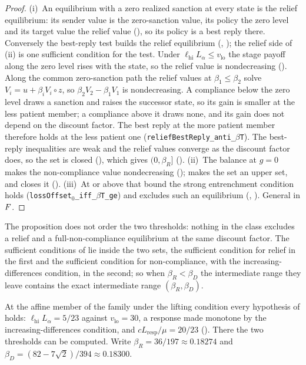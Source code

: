 \begin{proof}
(i)~An equilibrium with a zero realized sanction at every state is the relief equilibrium:
its sender value is the zero-sanction value, its policy the zero level and its target value
the relief value (), so its policy is a best reply
there. Conversely the best-reply test builds the relief equilibrium
(, ); the relief
side of (ii) is one sufficient condition for the test. Under
$\ell_{\mathrm{hi}}L_\alpha\le v_{\mathrm{lo}}$ the stage payoff along the zero level rises with
the state, so the relief value is nondecreasing (). Along the common
zero-sanction path the relief values at $\beta_1\le\beta_2$ solve $V_i=u+\beta_iV_i\circ z$,
so $\beta_2V_2-\beta_1V_1$ is nondecreasing. A compliance below the zero level draws a sanction
and raises the successor state, so its gain is smaller at the less patient member; a
compliance above it draws none, and its gain does not depend on the discount factor. The best
reply at the more patient member therefore holds at the less patient one
(\texttt{reliefBestReply\_anti\_$\beta$T}). The best-reply inequalities are weak and the relief
values converge as the discount factor does, so the set is closed
(), which gives $(0,\beta_R]$
(). (ii)~The balance at $g=0$ makes the non-compliance value
nondecreasing ();  makes the set
an upper set, and  closes it ().
(iii)~At or above that bound the strong entrenchment condition holds
(\texttt{lossOffset$_0$\_iff\_$\beta$T\_ge}) and excludes such an equilibrium
(, ). General in $F$.
\end{proof}

The proposition does not order the two thresholds: nothing in the class excludes a relief and
a full-non-compliance equilibrium at the same discount factor. The sufficient conditions of
 lie inside the two sets, the sufficient condition for relief in the first and
the sufficient condition for non-compliance, with the increasing-differences condition, in the second;
so when $\beta_R<\beta_D$ the intermediate range they leave
contains the exact intermediate range $(\beta_R,\beta_D)$.

At the affine member of the family under the lifting condition every hypothesis of  holds:
$\ell_{\mathrm{hi}}L_\alpha=5/23$ against $v_{\mathrm{lo}}=30$, a response made monotone by the
increasing-differences condition, and $cL_{\mathrm{resp}}/\mu=20/23$ (). There the two
thresholds can be computed. Write $\beta_R=36/197\approx0.18274$ and
$\beta_D=(82-7\sqrt2)/394\approx0.18300$.

